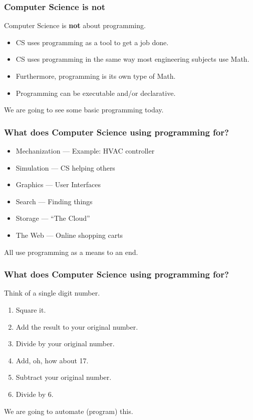 \documentclass{beamer}
\begin{document}
\begin{frame}
\frametitle{Computer Science is {\bf not}}
\Large
Computer Science is {\bf not\/} about programming.
\frameskip

\begin{itemize}
\item CS uses programming as a tool to get a job done.
\item CS uses programming in the same way most engineering subjects use Math.
\item Furthermore, programming is its own type of Math.
\item Programming can be executable and/or declarative.
\end{itemize}

\frameskip
We are going to see some basic programming today.
\end{frame}

\begin{frame}
\frametitle{What does Computer Science using {\bf programming} for?}
\Large
\begin{itemize}
\item Mechanization --- Example: HVAC controller
\item Simulation --- CS helping others
\item Graphics --- User Interfaces
\item Search --- Finding things
\item Storage --- ``The Cloud''
\item The Web --- Online shopping carts
\end{itemize}

All use programming as a means to an end.

\end{frame}

\begin{frame}
\frametitle{What does Computer Science using {\bf programming} for?}
\Large

Think of a single digit number.

\begin{enumerate}
\item Square it.
\item Add the result to your original number.
\item Divide by your original number.
\item Add, oh, how about 17.
\item Subtract your original number.
\item Divide by 6. 
\end{enumerate}

We are going to automate (program) this.

\end{frame}
\end{document}

